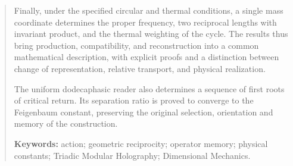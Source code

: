 \begin{abstract}
Finally, under the specified circular and thermal conditions, a single
mass coordinate determines the proper frequency, two reciprocal lengths
with invariant product, and the thermal weighting of the cycle. The
results thus bring production, compatibility, and reconstruction into a
common mathematical description, with explicit proofs and a distinction
between change of representation, relative transport, and physical
realization.


The uniform dodecaphasic reader also determines a sequence of first roots of critical return. Its separation ratio is proved to converge to the Feigenbaum constant, preserving the original selection, orientation and memory of the construction.



\par\smallskip\noindent\textbf{Keywords:} action; geometric reciprocity; operator memory; physical constants; Triadic Modular Holography; Dimensional Mechanics.
\end{abstract}


\endgroup

